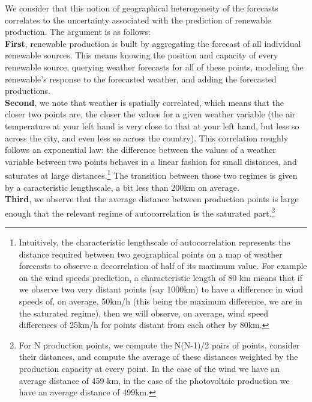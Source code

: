 We consider that this notion of geographical heterogeneity of the forecasts correlates to the uncertainty associated with the prediction of renewable production. The argument is as follows: \\

\textbf{First}, renewable production is built by aggregating the forecast of all individual renewable sources. This means knowing the position and capacity of every renewable source, querying weather forecasts for all of these points, modeling the renewable's response to the forecasted weather, and adding the forecasted productions. \\

\textbf{Second}, we note that weather is spatially correlated, which means that the closer two points are, the closer the values for a given weather variable (the air temperature at your left hand is very close to that at your left hand, but less so across the city, and even less so across the country). This correlation roughly follows an exponential law: the difference between the values of a weather variable between two points behaves in a linear fashion for small distances, and saturates at large distances.\footnote{Intuitively, the characteristic lengthscale of autocorrelation represents the distance required between two geographical points on a map of weather forecasts to observe a decorrelation of half of its maximum value. For example on the wind speeds prediction, a characteristic length of 80 km means that if we observe two very distant points (say 1000km) to have a difference in wind speeds of, on average, 50km/h (this being the maximum difference, we are in the saturated regime), then we will observe, on average, wind speed differences of 25km/h for points distant from each other by 80km.} The transition between those two regimes is given by a caracteristic lengthscale, a bit less than 200km on average. \\

\textbf{Third}, we observe that the average distance between production points is large enough that the relevant regime of autocorrelation is the saturated part.\footnote{For N production points, we compute the N(N-1)/2 pairs of points, consider their distances, and compute the average of these distances weighted by the production capacity at every point. In the case of the wind we have an average distance of 459 km, in the case of the photovoltaic production we have an average distance of 499km.} \\


